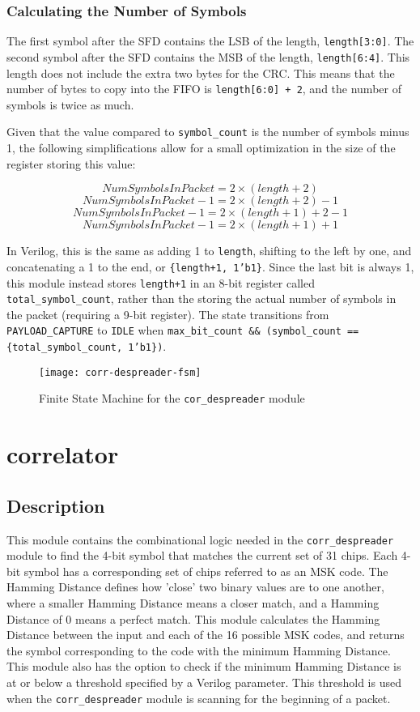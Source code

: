 \subsubsection{Calculating the Number of Symbols}
The first symbol after the SFD contains the LSB of the length, \texttt{length[3:0]}. The second symbol after the SFD contains the MSB of the length, \texttt{length[6:4]}. This length does not include the extra two bytes for the CRC. This means that the number of bytes to copy into the FIFO is \texttt{length[6:0] + 2}, and the number of symbols is twice as much.

Given that the value compared to \texttt{symbol\_count} is the number of symbols minus 1, the following simplifications allow for a small optimization in the size of the register storing this value:

$$ NumSymbolsInPacket = 2 \times (length + 2) $$
$$ NumSymbolsInPacket - 1 = 2 \times (length + 2) - 1 $$
$$ NumSymbolsInPacket - 1 = 2 \times (length + 1) + 2 - 1 $$
$$ NumSymbolsInPacket - 1 = 2 \times (length + 1) + 1 $$

In Verilog, this is the same as adding 1 to \texttt{length}, shifting to the left by one, and concatenating a 1 to the end, or \texttt{\{length+1, 1'b1\}}. Since the last bit is always 1, this module instead stores \texttt{length+1} in an 8-bit register called \texttt{total\_symbol\_count}, rather than the storing the actual number of symbols in the packet (requiring a 9-bit register). The state transitions from \texttt{PAYLOAD\_CAPTURE} to \texttt{IDLE} when \texttt{max\_bit\_count \&\& (symbol\_count == \{total\_symbol\_count, 1'b1\})}.


\begin{figure}
\centering
\texttt{[image: corr-despreader-fsm]}
\caption{Finite State Machine for the \texttt{cor\_despreader} module}
\label{fig:corr-despreader-fsm}
\end{figure}

\section{correlator} \label{correlator}
\subsection{Description}
This module contains the combinational logic needed in the \texttt{corr\_despreader} module to find the 4-bit symbol that matches the current set of 31 chips. Each 4-bit symbol has a corresponding set of chips referred to as an MSK code. The Hamming Distance defines how 'close' two binary values are to one another, where a smaller Hamming Distance means a closer match, and a Hamming Distance of 0 means a perfect match. This module calculates the Hamming Distance between the input and each of the 16 possible MSK codes, and returns the symbol corresponding to the code with the minimum Hamming Distance. This module also has the option to check if the minimum Hamming Distance is at or below a threshold specified by a Verilog parameter. This threshold is used when the \texttt{corr\_despreader} module is scanning for the beginning of a packet.

